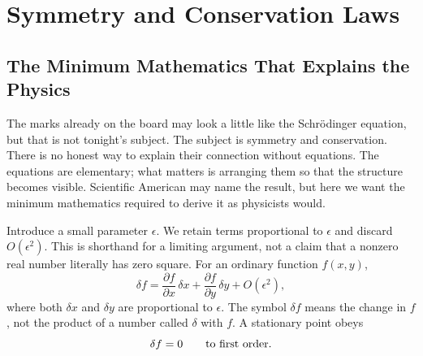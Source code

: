 \chapter{Symmetry and Conservation Laws}


\section{The Minimum Mathematics That Explains the Physics}

The marks already on the board may look a little like the Schrödinger
equation, but that is not tonight's subject.  The subject is symmetry and
conservation.  There is no honest way to explain their connection without
equations.  The equations are elementary; what matters is arranging them so
that the structure becomes visible.  Scientific American may name the result,
but here we want the minimum mathematics required to derive it as physicists
would.

Introduce a small parameter \(\epsilon\).  We retain terms proportional to
\(\epsilon\) and discard \(O(\epsilon^2)\).  This is shorthand for a limiting
argument, not a claim that a nonzero real number literally has zero square.
For an ordinary function \(f(x,y)\),
\begin{equation}
  \delta f
  =\frac{\partial f}{\partial x}\,\delta x
   +\frac{\partial f}{\partial y}\,\delta y
   +O(\epsilon^2),
  \label{eq:first-variation-f}
\end{equation}
where both \(\delta x\) and \(\delta y\) are proportional to \(\epsilon\).
The symbol \(\delta f\) means the change in \(f\), not the product of a number
called \(\delta\) with \(f\).  A stationary point obeys
\begin{equation}
  \delta f=0
  \qquad\hbox{to first order.}
  \label{eq:stationary-f}
\end{equation}

